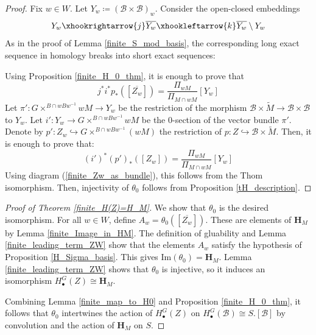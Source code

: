 \documentclass[11pt]{article}
\newcommand{\B}{\mathcal{B}}
\renewcommand{\H}{\textbf{H}}
\newcommand{\1}{\mathbb{1}}
\newcommand{\HBM}[2]{H_\bullet^{#1}(#2)}
\newcommand{\tM}{\widetilde{M}}
\renewcommand{\Im}{\text{Im}}
\theoremstyle{definition}
\numberwithin{equation}{section}
\begin{document}
\begin{proof}
    Fix $w\in W$. Let $Y_w \coloneqq (\B\times\B)_w$. Consider the open-closed embeddings $$Y_w \xhookrightarrow{j} \overline{Y_w} \xhookleftarrow{k} \overline{Y_w} \setminus Y_w$$ As in the proof of Lemma \ref{finite_S_mod_basis}, the corresponding long exact sequence in homology breaks into short exact sequences:
    \begin{center}
    \end{center}
    Using Proposition \ref{finite_H_0_thm}, it is enough to prove that 
    $$j^* i^* p_*([\overline{Z_w}]) = \frac{\Pi_{wM}}{\Pi_{M\cap wM}} [Y_w]$$ 
    Let $\pi' : G\times^{B\cap w B w^{-1}} wM \rightarrow Y_w$ be the restriction of the morphism $\B \times \tM \rightarrow \B\times\B$ to $Y_w$. Let $i' : Y_w \rightarrow G\times^{B\cap w B w^{-1}} wM$ be the $0$-section of the vector bundle $\pi'$. Denote by $p' : Z_w \hookrightarrow G\times^{B\cap w B w^{-1}} (wM)$ the restriction of $p : Z \hookrightarrow \B\times\tM$. Then, it is enough to prove that:
    $$(i')^* (p')_*([Z_w]) = \frac{\Pi_{wM}}{\Pi_{M\cap wM}} [Y_w]$$
    Using diagram (\ref{finite_Zw_as_bundle}), this follows from the Thom isomorphism. Then, injectivity of $\theta_0$ follows from Proposition \ref{tH_description}.
\end{proof}

\begin{proof}[Proof of Theorem \ref{finite_H(Z)=H_M}]
    We show that $\theta_0$ is the desired isomorphism. For all $w\in W$, define $A_w = \theta_0\left(\left[\overline{Z_w}\right]\right)$. These are elements of $\H_M$ by Lemma \ref{finite_Image_in_HM}. The definition of gluability and Lemma \ref{finite_leading_term_ZW} show that the elements $A_w$ satisfy the hypothesis of Proposition \ref{H_Sigma_basis}. This gives $\Im(\theta_0) = \H_M$. Lemma \ref{finite_leading_term_ZW} shows that $\theta_0$ is injective, so it induces an isomorphism $\HBM{G}{Z} \cong \H_M$.

    Combining Lemma \ref{finite_map_to_H0} and Proposition \ref{finite_H_0_thm}, it follows that $\theta_0$ intertwines the action of $\HBM{G}{Z}$ on $\HBM{G}{\B}\cong S.[\B]$ by convolution and the action of $\H_M$ on $S$.
\end{proof}
\end{document}
